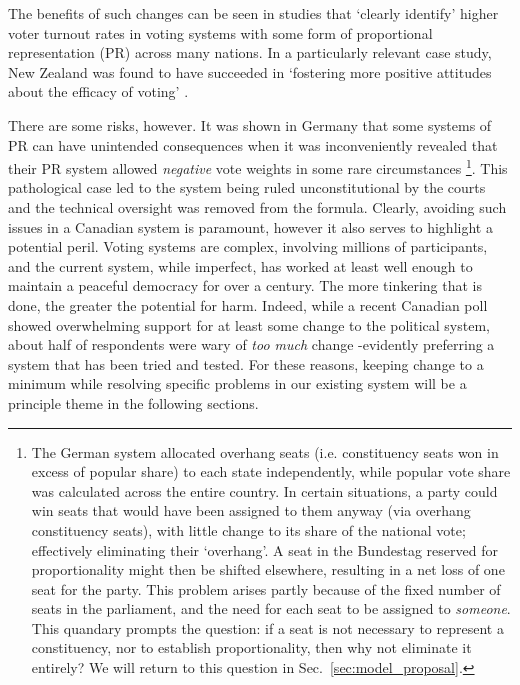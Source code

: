 \documentclass[DIV=calc, paper=a4, fontsize=11pt, twocolumn]{scrartcl}	 %
\begin{document}
The benefits of such changes can be seen in studies that `clearly identify' higher voter turnout rates in voting systems with some form of proportional representation (PR) \cite{Blais}
 across many nations. In a particularly relevant case study, New Zealand was found to have succeeded in `fostering more positive attitudes about the efficacy of voting' \cite{NZ_PR_results}.

There are some risks, however. It was shown in Germany that some systems of PR can have unintended consequences when it was inconveniently revealed that their PR system allowed \emph{negative} vote weights in some rare circumstances\cite{Die_Zeit_negative_vote} 
\footnote
{
The German system allocated overhang seats (i.e. constituency seats won in excess of popular share) to each state independently, while popular vote share was calculated across the entire country.
In certain situations, a party could win seats that would have been assigned to them anyway (via overhang constituency seats), with little change to its share of the national vote; effectively eliminating their `overhang'. A seat in the Bundestag reserved for proportionality might then be shifted elsewhere, resulting in a net loss of one seat for the party.
This problem arises partly because of the fixed number of seats in the parliament, and the need for each seat to be assigned to \emph{someone}. This quandary prompts the question: if a seat is not necessary to represent a constituency, nor to establish proportionality, then why not eliminate it entirely? We will return to this question in Sec.~\ref{sec:model_proposal}.
}.
This pathological case led to the system being ruled unconstitutional by the courts and the technical oversight was removed from the formula. 
Clearly, avoiding such issues in a Canadian system is paramount, however it also serves to highlight a potential peril.
Voting systems are complex, involving millions of participants, and the current system, while imperfect, has worked at least well enough to maintain a peaceful democracy for over a century. 
The more tinkering that is done, the greater the potential for harm. 
Indeed, while a recent Canadian poll\cite{Broadbent_poll} showed overwhelming support for at least some change to the political system, about half of respondents were wary of \emph{too much} change \--evidently preferring a system that has been tried and tested. 
For these reasons, keeping change to a minimum while resolving specific problems in our existing system will be a principle theme in the following sections.
\end{document}
